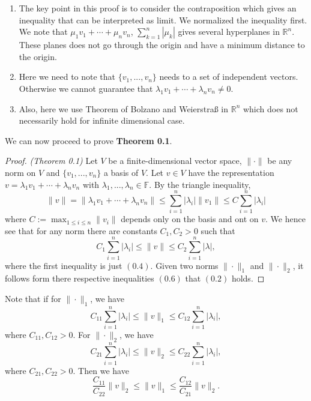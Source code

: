 \documentclass[10pt]{article}
\newcommand{\F}{\mathbb{F}}
\newcommand{\R}{\mathbb{R}}
\begin{document}
  \begin{remark}
    \begin{enumerate}[(1)]
      \item The key point in this proof is to consider the contraposition which gives an inequality that can be interpreted as limit.
      We normalized the inequality first. 
      We note that $\mu_{1}v_{1}+\cdots+\mu_{n}v_{n}$, $\sum_{k = 1}^{n}|\mu_{k}|$ gives several hyperplanes in $\R^{n}$.
      These planes does not go through the origin and have a minimum distance to the origin.

      \item Here we need to note that $\{v_{1},...,v_{n}\}$ needs to a set of independent vectors. 
      Otherwise we cannot guarantee that $\lambda_{1}v_{1}+\cdots+\lambda_{n}v_{n} \neq 0$.

      \item Also, here we use Theorem of Bolzano and Weierstra{\ss} in $\R^{n}$ which does not necessarily hold for infinite dimensional case.
    \end{enumerate}
  \end{remark}

  We can now proceed to prove \textbf{Theorem 0.1}.

  \begin{proof}
    \textit{(Theorem 0.1)} 
    Let $V$ be a finite-dimensional vector space, $\|\cdot\|$ be any norm on $V$ and $\{v_{1},...,v_{n}\}$ a basis of $V$.
    Let $v \in V$ have the representation $v = \lambda_{1}v_{1}+\cdots+\lambda_{n}v_{n}$ with $\lambda_{1},...,\lambda_{n} \in \F$.
    By the triangle inequality,
    \[
      \|v\| = \|\lambda_{1}v_{1}+\cdots+\lambda_{n}v_{n}\| 
      \leq \sum_{i = 1}^{n}|\lambda_{i}|\|v_{1}\| \leq C \sum_{i = 1}^{n}|\lambda_{i}|  
    \]
    where $C:=\mathop{\max}_{1 \leq i \leq n}\|v_{i}\|$ depends only on the basis and ont on $v$.
    We hence see that for any norm there are constants $C_{1},C_{2} > 0$ such that 
    \begin{equation}
      C_{1}\sum_{i = 1}^{n}|\lambda_{i}| \leq \|v\| \leq C_{2}\sum_{i = 1}^{n}|\lambda|,
    \end{equation}
    where the first inequality is just $(0.4)$. Given two norms $\|\cdot\|_{1}$ and $\|\cdot\|_{2}$,
    it follows form there respective inequalities $(0.6)$ that $(0.2)$ holds.
  \end{proof}

  \begin{remark}
    Note that if for $\|\cdot\|_{1}$, we have
    \[C_{11}\sum_{i = 1}^{n}|\lambda_{i}| \leq \|v\|_{1} \leq C_{12}\sum_{i = 1}^{n}|\lambda_{i}|,\]
    where $C_{11},C_{12} > 0$. For $\|\cdot\|_{2}$, we have
    \[C_{21}\sum_{i = 1}^{n}|\lambda_{i}| \leq \|v\|_{2} \leq C_{22}\sum_{i = 1}^{n}|\lambda_{i}|,\]
    where $C_{21},C_{22} > 0$. Then we have
    \[\frac{C_{11}}{C_{22}}\|v\|_{2} \leq \|v\|_{1} \leq \frac{C_{12}}{C_{21}}\|v\|_{2}.\]
  \end{remark}
\end{document}
